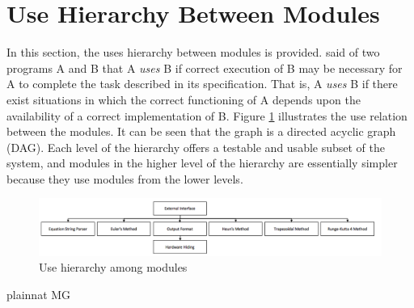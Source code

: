 \documentclass[12pt, titlepage]{article}
\begin{document}
\section{Use Hierarchy Between Modules} \label{SecUse}

In this section, the uses hierarchy between modules is
provided. \citet{Parnas1978} said of two programs A and B that A {\em uses} B if
correct execution of B may be necessary for A to complete the task described in
its specification. That is, A {\em uses} B if there exist situations in which
the correct functioning of A depends upon the availability of a correct
implementation of B.  Figure \ref{FigUH} illustrates the use relation between
the modules. It can be seen that the graph is a directed acyclic graph
(DAG). Each level of the hierarchy offers a testable and usable subset of the
system, and modules in the higher level of the hierarchy are essentially simpler
because they use modules from the lower levels.

\begin{figure}[H]
\centering
\includegraphics[width=1.1\textwidth]{use.png}
\caption{Use hierarchy among modules}
\label{FigUH}
\end{figure}




 {plainnat}
 {MG}
\end{document}
